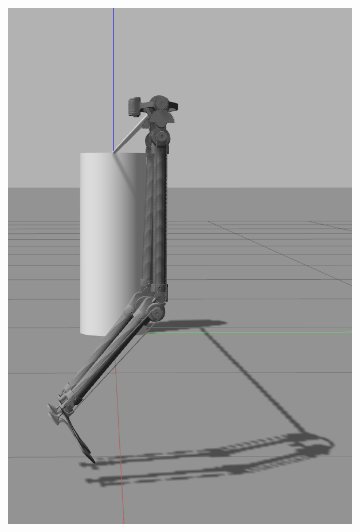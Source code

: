 \begin{figure}[ht!]
\begin{subfigure}[b]{0.16\textwidth}
        \includegraphics[width=\textwidth]{figures/gazebo_jumping_3}
    \end{subfigure}
    \begin{subfigure}[b]{0.16\textwidth}

\end{subfigure}
\end{figure}
